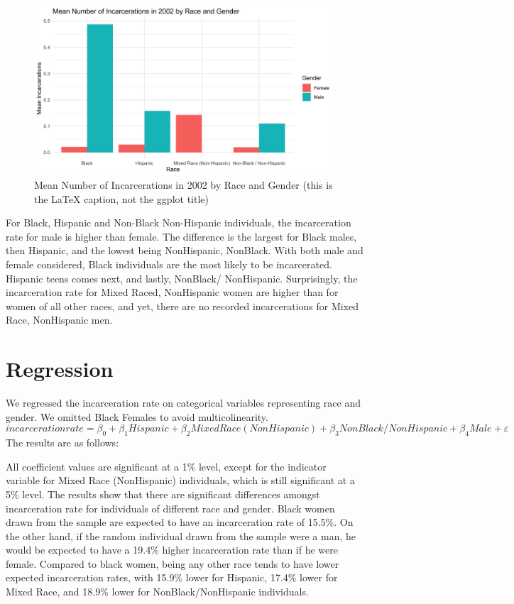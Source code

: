 \documentclass{article}
\begin{document}
\begin{figure}[H]
    \begin{center}
        \includegraphics[width=.85\textwidth]{incarcerations_by_racegender.png}
    \end{center}
    \caption{Mean Number of Incarcerations in 2002 by Race and Gender (this is the LaTeX caption, not the ggplot title)}
    \label{fig:graph}
\end{figure}

For Black, Hispanic and Non-Black Non-Hispanic individuals, the incarceration rate for male is higher than female. The difference is the largest for Black males, then Hispanic, and the lowest being NonHispanic, NonBlack. 
With both male and female considered, Black individuals are the most likely to be incarcerated. Hispanic teens comes next, and lastly, NonBlack/ NonHispanic. Surprisingly, the incarceration rate for Mixed Raced, NonHispanic women
are higher than for women of all other races, and yet, there are no recorded incarcerations for Mixed Race, NonHispanic men. 

\section{Regression}

We regressed the incarceration rate on categorical variables representing race and gender. We omitted Black Females to avoid multicolinearity. 
$$
incarceration rate = \beta_{0} + \beta_{1}Hispanic + \beta_{2}Mixed Race (NonHispanic) + \beta_{3} NonBlack/ NonHispanic + \beta_{4} Male + \varepsilon
$$
The results are as follows: 



All coefficient values are significant at a 1\% level, except for the indicator variable for Mixed Race (NonHispanic) individuals, which is still significant at a 5\% level. The results show that there are significant differences amongst incarceration rate for individuals of different race and gender. Black women drawn from the sample are expected to have an incarceration rate of 15.5\%. On the other hand, if the random individual drawn from the sample were a man, he would be expected to have a 19.4\% higher incarceration rate than if he were female. Compared to black women, being any other race tends to have lower expected incarceration rates, with 15.9\% lower for Hispanic, 17.4\% lower for Mixed Race, and 18.9\% lower for NonBlack/NonHispanic individuals.
\end{document}
